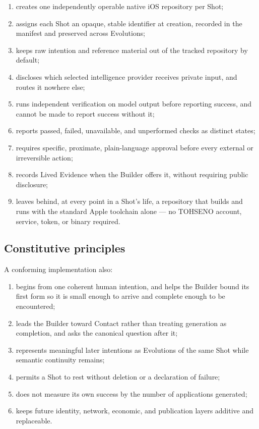 \documentclass[11pt]{article}
\newcommand{\TOH}{TOHSENO}
\begin{document}
\begin{enumerate}
\item creates one independently operable native iOS repository per Shot;
\item assigns each Shot an opaque, stable identifier at creation,
      recorded in the manifest and preserved across Evolutions;
\item keeps raw intention and reference material out of the tracked
      repository by default;
\item discloses which selected intelligence provider receives private
      input, and routes it nowhere else;
\item runs independent verification on model output before reporting
      success, and cannot be made to report success without it;
\item reports passed, failed, unavailable, and unperformed checks as
      distinct states;
\item requires specific, proximate, plain-language approval before every
      external or irreversible action;
\item records Lived Evidence when the Builder offers it, without
      requiring public disclosure;
\item leaves behind, at every point in a Shot's life, a repository that
      builds and runs with the standard Apple toolchain alone --- no
      \TOH{} account, service, token, or binary required.
\end{enumerate}

\subsection{Constitutive principles}

A conforming implementation also:

\begin{enumerate}
\item begins from one coherent human intention, and helps the Builder
      bound its first form so it is small enough to arrive and complete
      enough to be encountered;
\item leads the Builder toward Contact rather than treating generation
      as completion, and asks the canonical question after it;
\item represents meaningful later intentions as Evolutions of the same
      Shot while semantic continuity remains;
\item permits a Shot to rest without deletion or a declaration of
      failure;
\item does not measure its own success by the number of applications
      generated;
\item keeps future identity, network, economic, and publication layers
      additive and replaceable.
\end{enumerate}
\end{document}
